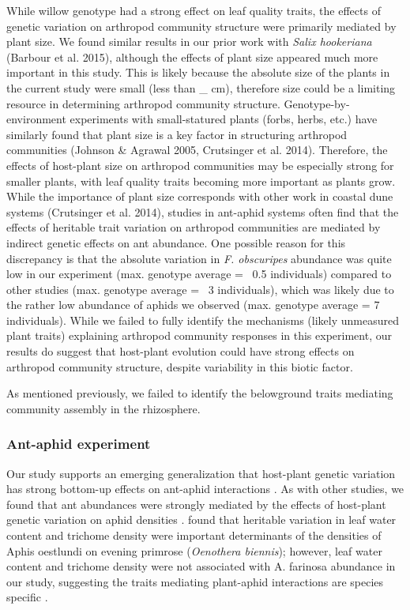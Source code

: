 \documentclass[11pt]{article}
\begin{document}
While willow genotype had a strong effect on leaf quality traits, the effects of genetic variation on arthropod community structure were primarily mediated by plant size. We found similar results in our prior work with \textit{Salix hookeriana} (Barbour et al. 2015), although the effects of plant size appeared much more important in this study. This is likely because the absolute size of the plants in the current study were small (less than \_ cm), therefore size could be a limiting resource in determining arthropod community structure. Genotype-by-environment experiments with small-statured plants (forbs, herbs, etc.) have similarly found that plant size is a key factor in structuring arthropod communities (Johnson \& Agrawal 2005, Crutsinger et al. 2014). Therefore, the effects of host-plant size on arthropod communities may be especially strong for smaller plants, with leaf quality traits becoming more important as plants grow. While the importance of plant size corresponds with other work in coastal dune systems (Crutsinger et al. 2014), studies in ant-aphid systems often find that the effects of heritable trait variation on arthropod communities are mediated by indirect genetic effects on ant abundance. One possible reason for this discrepancy is that the absolute variation in \textit{F. obscuripes} abundance was quite low in our experiment (max. genotype average = ~0.5 individuals) compared to other studies (max. genotype average = ~3 individuals), which was likely due to the rather low abundance of aphids we observed (max. genotype average = 7 individuals). While we failed to fully identify the mechanisms (likely unmeasured plant traits) explaining arthropod community responses in this experiment, our results do suggest that host-plant evolution could have strong effects on arthropod community structure, despite variability in this biotic factor. 

As mentioned previously, we failed to identify the belowground traits mediating community assembly in the rhizosphere.

\subsubsection*{Ant-aphid experiment}

Our study supports an emerging generalization that host-plant genetic
variation has strong bottom-up effects on ant-aphid interactions
\cite{Johnson_2008}\cite{Mooney_2008}\cite{Abdala_Roberts_2012}. As with other studies,
we found that ant abundances were strongly mediated by the effects of
host-plant genetic variation on aphid densities
\cite{Johnson_2008}\cite{Mooney_2008}. \cite{Johnson_2008} found that heritable
variation in leaf water content and trichome density were important
determinants of the densities of Aphis oestlundi on evening primrose
(\emph{Oenothera biennis}); however, leaf water content and trichome
density were not associated with A. farinosa abundance in our study,
suggesting the traits mediating plant-aphid interactions are species
specific \cite{Z_st_2016}.
\end{document}
